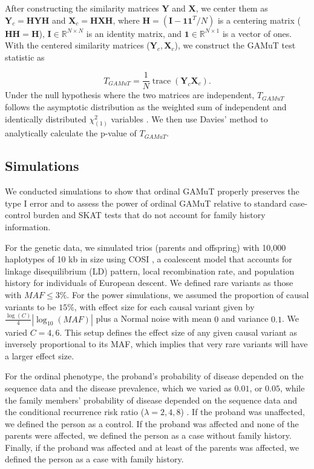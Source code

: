 \documentclass[]{article}
\DeclareMathOperator{\trace}{trace}
\begin{document}
After constructing the similarity matrices \(\mathbf{Y}\) and \(\mathbf{X}\),
we center them as \(\mathbf{Y}_c = \mathbf{HYH}\) and \(\mathbf{X}_c = \mathbf{HXH}\),
where \(\mathbf{H}=(\mathbf{I}-\mathbf{11}^T/N)\) is a centering matrix
(\(\mathbf{HH} = \mathbf{H}\)), \(\mathbf{I} \in \mathbb{R}^{N \times N}\) is an
identity matrix, and \(\mathbf{1} \in \mathbb{R}^{N \times 1}\) is a vector of ones.
With the centered similarity matrices (\(\mathbf{Y}_c, \mathbf{X}_c\)), we construct
the GAMuT test statistic as

\[
T_{GAMuT}=\frac{1}{N}\trace(\mathbf{Y}_c\mathbf{X}_c).
\]
Under the null hypothesis where the two matrices are independent,
\(T_{GAMuT}\) follows the asymptotic distribution as the weighted
sum of independent and identically distributed \(\chi^2_{(1)}\) variables \citep{Broadaway2016}.
We then use Davies' method \citep{Davies1980} to analytically calculate the p-value of \(T_{GAMuT}\).

\hypertarget{simulations}{%
\subsection{Simulations}\label{simulations}}

We conducted simulations to show that ordinal GAMuT properly preserves the type I error
and to assess the power of ordinal GAMuT relative to
standard case-control burden \citep{Li2008, Madsen2009} and SKAT \citep{Wu2011} tests that do not account for family history information.

For the genetic data, we simulated trios (parents and offspring) with 10,000 haplotypes of 10 kb in size using COSI \citep{cosi},
a coalescent model that accounts for linkage disequilibrium (LD) pattern, local recombination rate, and population
history for individuals of European descent. We defined rare variants as those with \(MAF \leq 3\%\).
For the power simulations, we assumed the proportion of causal variants to be \(15\%\),
with effect size for each causal variant given by \(\frac{\log(C)}{4}|\log_{10}(MAF)|\) plus a Normal noise with mean \(0\) and variance \(0.1\). We varied \(C=4,6\). This setup defines the
effect size of any given causal variant as inversely proportional to its MAF, which implies
that very rare variants will have a larger effect size.

For the ordinal phenotype, the proband's probability of disease depended on the sequence
data and the disease prevalence, which we varied as \(0.01\), or \(0.05\), while the family
members' probability of disease depended on the sequence data and the conditional
recurrence risk ratio (\(\lambda=2,4,8\)) \citep{Epstein2015}. If the proband was unaffected,
we defined the person as a control. If the proband was affected and none of the parents were affected, we defined the person
as a case without family history. Finally, if the proband was affected and at least of the parents was affected, we defined the person as a case with family history.
\end{document}
